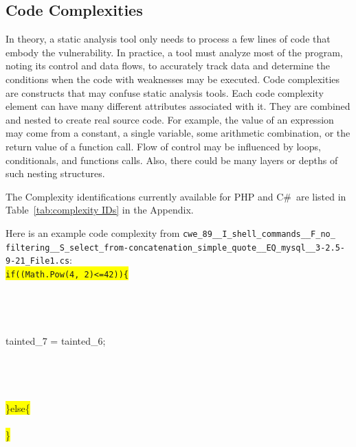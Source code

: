 \documentclass[12pt]{article}
\newcommand{\CSharp}{C{\fontseries{b}\selectfont\#}}
\begin{document}
\subsection{Code Complexities}
\label{sec:code complexities}

In theory, a static analysis tool only needs to process a few lines of
code that
embody the vulnerability. In practice, a tool must analyze most 
of the program,
noting its control and data flows, to accurately track data and
determine the
conditions when the code with weaknesses may be executed.
Code complexities are constructs that may confuse static 
analysis tools.  
Each code complexity element can have many different attributes
associated with it.
They are combined and nested to create real source code.  
For example, the value 
of an expression may come from a constant, a single variable, 
some arithmetic 
combination, or the return value of a function call.  
Flow of control may be
influenced by loops, conditionals, and functions calls.  
Also, there could be many 
layers or depths of such nesting structures.  

The Complexity identifications currently available for PHP 
and \CSharp\ are listed in 
Table~\ref{tab:complexity IDs} in the Appendix.

Here is an example code complexity from \verb|cwe_89__I_shell_commands__F_no_|\\ 
\verb|filtering__S_select_from-concatenation_simple_quote__EQ_mysql__3-2.5-| \\ 
\verb|9-21_File1.cs|: \\
{\texttt
{\colorbox{yellow}{if((Math.Pow(4, 2)<=42))\{}}\\
\\
\\
\\
\\
\hspace*{6em}tainted\_7 = tainted\_6;\\
\\
\\
\\              
\\
{\colorbox{yellow}{\}else\{}}\\
\\
{\colorbox{yellow}{\}}}
}
\end{document}
